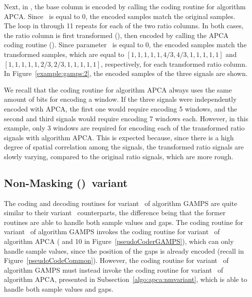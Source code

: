 Next, in , the base column is encoded by calling the coding routine for algorithm APCA. Since \epsilonB\ is equal to 0, the encoded samples match the original samples. The loop in  through 11 repeats for each of the two ratio columns. In both cases, the ratio column is first transformed (), then encoded by calling the APCA coding routine (). Since parameter \epsilonR\ is equal to 0, the encoded samples match the transformed samples, which are equal to $[1, 1, 1, 1, 1, 4/3, 4/3, 1, 1, 1, 1, 1]$ and $[1, 1, 1, 1, 1, 2/3, 2/3, 1, 1, 1, 1, 1]$, respectively, for each transformed ratio column. In Figure~\ref{example:gamps:2}, the encoded samples of the three signals are shown. 


We recall that the coding routine for algorithm APCA always uses the same amount of bits for encoding a window. If the three signals were independently encoded with APCA, the first one would require encoding 5 windows, and the second and third signals would require encoding 7 windows each. However, in this example, only 3 windows are required for encoding each of the transformed ratio signals with algorithm APCA. This is expected because, since there is a high degree of spatial correlation among the signals, the transformed ratio signals are slowly varying, compared to the original ratio signals, which are more rough.


\clearpage






\subsection{Non-Masking (\NOmaskalgo)\ variant}
\label{algo:gamps:nmvariant}


The coding and decoding routines for variant \NOmaskalgo\ of algorithm GAMPS are quite similar to their variant \maskalgo\ counterparts, the difference being that the former routines are able to handle both sample values and gaps. The coding routine for variant \maskalgo\ of algorithm GAMPS invokes the coding routine for variant \maskalgo\ of algorithm APCA ( and 10 in Figure~\ref{pseudoCoderGAMPS}), which can only handle sample values, since the position of the gaps is already encoded (recall  in Figure~\ref{pseudoCodeCommon}). However, the coding routine for variant \NOmaskalgo\ of algorithm GAMPS must instead invoke the coding routine for variant \NOmaskalgo\ of algorithm APCA, presented in Subsection~\ref{algo:apca:nmvariant}, which is able to handle both sample values and gaps.

